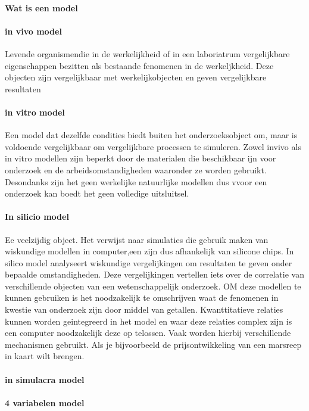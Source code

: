 \paragraph{Wat is een model}

\paragraph{in vivo model}
Levende organismendie in de werkelijkheid of in een laboriatrum vergelijkbare eigenschappen bezitten als bestaande fenomenen in de werkeljkheid. Deze objecten zijn vergelijkbaar met werkelijkobjecten en geven vergelijkbare resultaten
\paragraph{in vitro model}
Een model dat dezelfde condities biedt  buiten het onderzoeksobject om, maar is voldoende vergelijkbaar om vergelijkbare processen te simuleren.
Zowel invivo als in vitro modellen zijn beperkt door de materialen die beschikbaar ijn voor onderzoek en de arbeidsomstandigheden waaronder ze worden gebruikt. Desondanks zijn het geen werkelijke natuurlijke modellen dus vvoor een onderzoek kan boedt het geen volledige uitsluitsel.
\paragraph{In silicio model}
Ee veelzijdig object. Het verwijst naar simulaties die gebruik maken van wiskundige modellen in computer,een zijn dus afhankelijk van silicone chips. In silico model analyseert  wiskundige vergelijkingen om resultaten te geven onder bepaalde omstandigheden. Deze vergelijkingen vertellen iets over de correlatie van verschillende objecten van een wetenschappelijk onderzoek. OM deze modellen te kunnen gebruiken is het noodzakelijk te omschrijven waat de fenomenen in kwestie van onderzoek zijn door middel van getallen. Kwanttitatieve relaties kunnen worden geintegreerd in het model en waar deze relaties complex zijn is een computer noodzakelijk deze op telossen. Vaak worden hierbij verschillende mechanismen gebruikt. Als je bijvoorbeeld de prijsontwikkeling van een marsreep in kaart wilt brengen.
\paragraph{in simulacra model}


\paragraph{4 variabelen model}





